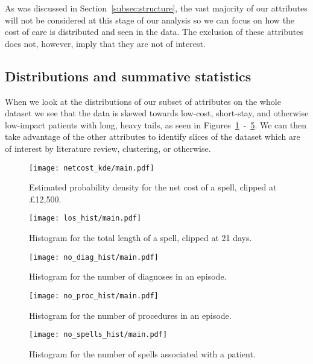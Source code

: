 As was discussed in Section~\ref{subsec:structure}, the vast majority of our
attributes will not be considered at this stage of our analysis so we can focus
on how the cost of care is distributed and seen in the data. The exclusion of
these attributes does not, however, imply that they are not of interest. 

\subsection{Distributions and summative
statistics}\label{subsec:distributions_statistics}
\graphicspath{{./img/general/}}

When we look at the distributions of our subset of attributes on the whole
dataset we see that the data is skewed towards low-cost, short-stay, and
otherwise low-impact patients with long, heavy tails, as seen in
Figures~\ref{fig:netcost_kde}~\--~\ref{fig:no_spells_hist}. We can then take
advantage of the other attributes to identify slices of the dataset which are of
interest by literature review, clustering, or otherwise.

\begin{figure}[h]
    \centering
    \texttt{[image: netcost\_kde/main.pdf]}
    \caption{Estimated probability density for the net cost of a spell, clipped
    at \pounds12,500.}\label{fig:netcost_kde}
\end{figure}

\begin{figure}[h]
    \centering
    \texttt{[image: los\_hist/main.pdf]}
    \caption{Histogram for the total length of a spell, clipped at 21
    days.}\label{fig:los_hist}
\end{figure}

\begin{figure}[h]
    \centering
    \texttt{[image: no\_diag\_hist/main.pdf]}
    \caption{Histogram for the number of diagnoses in an
    episode.}\label{fig:no_diag_hist}
\end{figure}

\begin{figure}
    \centering
    \texttt{[image: no\_proc\_hist/main.pdf]}
    \caption{Histogram for the number of procedures in an
    episode.}\label{fig:no_proc_hist}
\end{figure}

\begin{figure}[h]
    \centering
    \texttt{[image: no\_spells\_hist/main.pdf]}
    \caption{Histogram for the number of spells associated with a
    patient.}\label{fig:no_spells_hist}
\end{figure}

